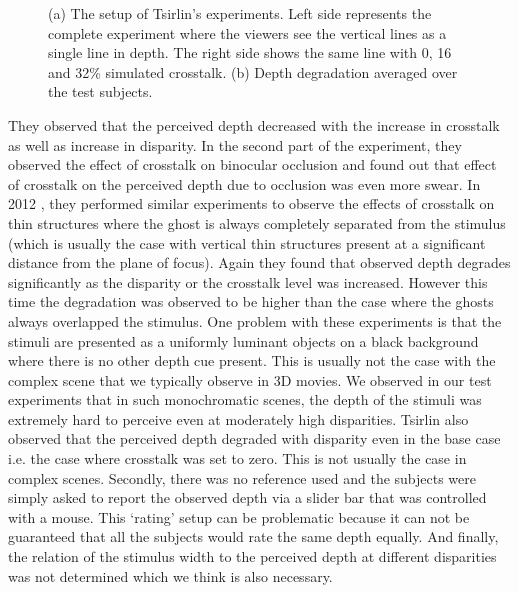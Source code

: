 \begin{figure}[htbp]
\begin{subfigure}[b]{0.5\textwidth}
        \caption{}\label{fig:tsirlin_res}
    \end{subfigure}
    \caption{(a) The setup of Tsirlin's experiments. Left side represents the complete experiment where the viewers see the vertical lines as a single line in depth. The right side shows the same line with 0, 16 and 32\% simulated crosstalk. (b) Depth degradation averaged over the test subjects.\label{fig:tsirlin}}
\end{figure}
They observed that the perceived depth decreased with the increase in crosstalk as well as increase in disparity. In the second part of the experiment, they observed the effect of crosstalk on binocular occlusion and found out that effect of crosstalk on the perceived depth due to occlusion was even more swear. In 2012 \cite{tsirlin2012effect}, they performed similar experiments to observe the effects of crosstalk on thin structures where the ghost is always completely separated from the stimulus (which is usually the case with vertical thin structures present at a significant distance from the plane of focus). Again they found that observed depth degrades significantly as the disparity or the crosstalk level was increased. However this time the degradation was observed to be higher than the case where the ghosts always overlapped the stimulus. One problem with these experiments is that the stimuli are presented as a uniformly luminant objects on a black background where there is no other depth cue present. This is usually not the case with the complex scene that we typically observe in 3D movies. We observed in our test experiments that in such monochromatic scenes, the depth of the stimuli was extremely hard to perceive even at moderately high disparities. Tsirlin also observed that the perceived depth degraded with disparity even in the base case i.e. the case where crosstalk was set to zero. This is not usually the case in complex scenes. Secondly, there was no reference used and the subjects were simply asked to report the observed depth via a slider bar that was controlled with a mouse. This `rating' setup can be problematic because it can not be guaranteed that all the subjects would rate the same depth equally. And finally, the relation of the stimulus width to the perceived depth at different disparities was not determined which we think is also necessary.

